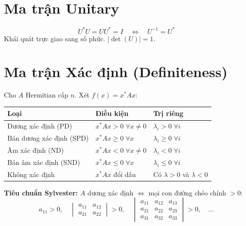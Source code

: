 \section{Ma trận Unitary}

\[
U^*U = UU^* = I \quad \Longleftrightarrow \quad U^{-1} = U^*
\]
Khái quát trực giao sang số phức. $|\det(U)| = 1$.

\section{Ma trận Xác định (Definiteness)}

Cho $A$ Hermitian cấp $n$. Xét $f(x) = x^*Ax$:

\begin{center}
\begin{tabular}{|l|l|l|}
\hline
\textbf{Loại} & \textbf{Điều kiện} & \textbf{Trị riêng} \\
\hline
Dương xác định (PD) & $x^*Ax > 0 \;\forall x \neq 0$ & $\lambda_i > 0 \;\forall i$ \\
Bán dương xác định (SPD) & $x^*Ax \ge 0 \;\forall x$ & $\lambda_i \ge 0 \;\forall i$ \\
Âm xác định (ND) & $x^*Ax < 0 \;\forall x \neq 0$ & $\lambda_i < 0 \;\forall i$ \\
Bán âm xác định (SND) & $x^*Ax \le 0 \;\forall x$ & $\lambda_i \le 0 \;\forall i$ \\
Không xác định & $x^*Ax$ đổi dấu & Có $\lambda > 0$ và $\lambda < 0$ \\
\hline
\end{tabular}
\end{center}

\textbf{Tiêu chuẩn Sylvester:} $A$ dương xác định $\iff$ mọi con đường chéo chính $> 0$:
\[
a_{11} > 0, \quad
\begin{vmatrix} a_{11} & a_{12} \\ a_{21} & a_{22} \end{vmatrix} > 0, \quad
\begin{vmatrix} a_{11} & a_{12} & a_{13} \\ a_{21} & a_{22} & a_{23} \\ a_{31} & a_{32} & a_{33} \end{vmatrix} > 0, \quad \dots
\]

